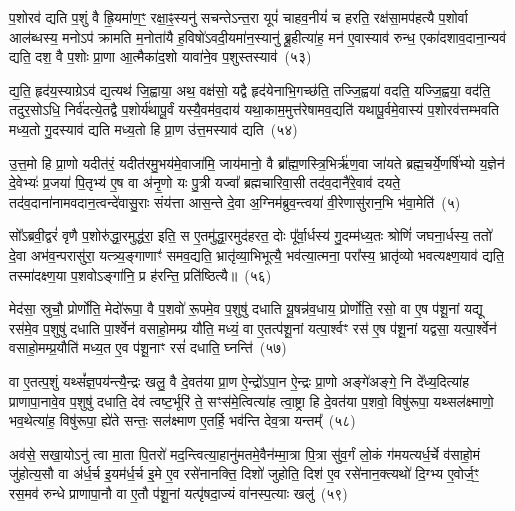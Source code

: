 प॒शोरव॑ द्यति प॒शुं वै ह्रि॒यमा॑ण॒ꣳ॒ रक्षा॒ꣴ॒स्यनु॑ सचन्ते\-ऽन्त॒रा यूपं॑ चाहव॒नीयं॑ च हरति॒ रक्ष॑सा॒मप॑हत्यै प॒शोर्वा आल॑ब्धस्य॒ मनो\-ऽप॑ क्रामति म॒नोता॑यै ह॒विषो॑\-ऽवदी॒यमा॑न॒स्यानु॑ ब्रू॒हीत्या॑ह॒ मन॑ ए॒वास्याव॑ रुन्ध॒ एका॑\-दशाव॒दाना॒न्यव॑ द्यति॒ दश॒ वै प॒शोः प्रा॒णा आ॒त्मैका॑द॒शो यावा॑ने॒व प॒शुस्तस्याव॑~(५३)

द्य॒ति॒ हृद॑य॒स्याग्रे\-ऽव॑ द्य॒त्यथ॑ जि॒ह्वाया॒ अथ॒ वक्ष॑सो॒ यद्वै हृद॑येनाभि॒गच्छ॑ति॒ तज्जि॒ह्वया॑ वदति॒ यज्जि॒ह्वया॒ वद॑ति॒ तदुर॒सो\-ऽधि॒ निर्व॑दत्ये॒तद्वै प॒शोर्य॑थापू॒र्वं यस्यै॒वम॑व॒दाय॑ यथा॒काम॒मुत्त॑रेषामव॒द्यति॑ यथापू॒र्वमे॒वास्य॑ प॒शोरव॑त्तम्भवति मध्य॒तो गु॒दस्याव॑ द्यति मध्य॒तो हि प्रा॒ण उ॑त्त॒मस्याव॑ द्यति~(५४)

उ॒त्त॒मो हि प्रा॒णो यदीत॑रं॒ यदीत॑रमु॒भय॑मे॒वाजा॑मि॒ जाय॑मानो॒ वै ब्रा᳚ह्म॒णस्त्रि॒भिर्\mbox{}ऋ॑ण॒वा जा॑यते ब्रह्म॒चर्ये॒णर्\mbox{}षि॑भ्यो य॒ज्ञेन॑ दे॒वेभ्यः॑ प्र॒जया॑ पि॒तृभ्य॑ ए॒ष वा अ॑नृ॒णो यः पु॒त्री यज्वा᳚ ब्रह्मचारिवा॒सी तद॑व॒दानै॑रे॒वाव॑ दयते॒ तद॑व॒दाना॑नामवदान॒त्वन्दे॑वासु॒राः संय॑त्ता आस॒न्ते दे॒वा अ॒ग्निम॑ब्रुव॒न्त्वया॑ वी॒रेणासु॑रान॒भि भ॑वा॒मेति॑~(५)

सो᳚\-ऽब्रवी॒द्वरं॑ वृणै प॒शोरु॑द्धा॒रमुद्ध॑रा॒ इति॒ स ए॒तमु॑द्धा॒रमुद॑हरत॒ दोः पू᳚र्वा॒र्धस्य॑ गु॒दम्म॑ध्य॒तः श्रोणिं॑ जघना॒र्धस्य॒ ततो॑ दे॒वा अभ॑व॒न्परासु॑रा॒ यत्त्र्य॒ङ्गाणाꣳ॑ समव॒द्यति॒ भ्रातृ॑व्या॒भिभूत्यै॒ भव॑त्या॒त्मना॒ परा᳚स्य॒ भ्रातृ॑व्यो भवत्यक्ष्ण॒याव॑ द्यति॒ तस्मा॑दक्ष्ण॒या प॒शवो\-ऽङ्गा॑नि॒ प्र ह॑रन्ति॒ प्रति॑ष्ठित्यै॥~(५६)

{\anuvakamend[{ए॒तौ प॑शू॒नाꣳ समे॑धस्यै॒व तस्यावो᳚त्त॒मस्याव॑ द्य॒तीति॒ पञ्च॑चत्वारिꣳशच्च}]}%

मेद॑सा॒ स्रुचौ॒ प्रोर्णो॑ति॒ मेदो॑रूपा॒ वै प॒शवो॑ रू॒पमे॒व प॒शुषु॑ दधाति यू॒षन्न॑व॒धाय॒ प्रोर्णो॑ति॒ रसो॒ वा ए॒ष प॑शू॒नां यद्यू रस॑मे॒व प॒शुषु॑ दधाति पा॒र्श्वेन॑ वसाहो॒मम्प्र यौ॑ति॒ मध्यं॒ वा ए॒तत्प॑शू॒नां यत्पा॒र्श्वꣳ रस॑ ए॒ष प॑शू॒नां यद्वसा॒ यत्पा॒र्श्वेन॑ वसाहो॒मम्प्र॒यौति॑ मध्य॒त ए॒व प॑शू॒नाꣳ रसं॑ दधाति॒ घ्नन्ति॑~(५७)

वा ए॒तत्प॒शुं यथ्सं᳚ज्ञ॒पय॑न्त्यै॒न्द्रः खलु॒ वै दे॒वत॑या प्रा॒ण ऐ॒न्द्रो॑\-ऽपा॒न ऐ॒न्द्रः प्रा॒णो अङ्गे॑अङ्गे॒ नि दे᳚ध्य॒दित्या॑ह प्राणापा॒नावे॒व प॒शुषु॑ दधाति॒ देव॑ त्वष्ट॒र्भूरि॑ ते॒ सꣳस॑मे॒त्वित्या॑ह त्वा॒ष्ट्रा हि दे॒वत॑या प॒शवो॒ विषु॑रूपा॒ यथ्सल॑क्ष्माणो॒ भव॒थेत्या॑ह॒ विषु॑रूपा॒ ह्ये॑ते सन्तः॒ सल॑क्ष्माण ए॒तर्\mbox{}हि॒ भव॑न्ति देव॒त्रा यन्तम्᳚~(५८)

अव॑से॒ सखा॒यो\-ऽनु॑ त्वा मा॒ता पि॒तरो॑ मद॒न्त्वित्या॒हानु॑मतमे॒वैन॑म्मा॒त्रा पि॒त्रा सु॑व॒र्गं लो॒कं ग॑मयत्यर्ध॒र्चे व॑साहो॒मं जु॑होत्य॒सौ वा अ॑र्ध॒र्च इ॒यम॑र्ध॒र्च इ॒मे ए॒व रसे॑नानक्ति॒ दिशो॑ जुहोति॒ दिश॑ ए॒व रसे॑नान॒क्त्यथो॑ दि॒ग्भ्य ए॒वोर्ज॒ꣳ॒ रस॒मव॑ रुन्धे प्राणापा॒नौ वा ए॒तौ प॑शू॒नां यत्पृ॑षदा॒ज्यं वा॑नस्प॒त्याः खलु॑~(५९)

